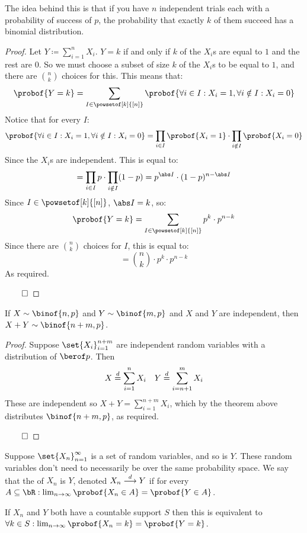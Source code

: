 The idea behind this is that if you have $n$ independent trials each with a probability of success of $p$, the probability that exactly
$k$ of them succeed has a binomial distribution.

\begin{proof}

	Let $Y\coloneqq\sum\limits_{i=1}^n X_i$.
	$Y=k$ if and only if $k$ of the $X_i$s are equal to $1$ and the rest are $0$.
	So we must choose a subset of size $k$ of the $X_i$s to be equal to $1$, and there are $\binom{n}{k}$ choices for this.
	This means that:
	\[ \probof{Y=k} = \sum_{I\in\powsetof[k]{[n]}}\probof{\forall i\in I: X_i=1, \forall i\notin I: X_i=0} \]
	Notice that for every $I$:
	\[ \probof{\forall i\in I: X_i=1, \forall i\notin I: X_i=0} = \prod_{i\in I}\probof{X_i=1} \cdot \prod_{i\notin I}\probof{X_i=0} \]
	Since the $X_i$s are independent.
	This is equal to:
	\[ = \prod_{i\in I}p \cdot \prod_{i\notin I}(1-p) = p^{\abs I}\cdot(1-p)^{n-\abs I} \]
	Since $I\in\powsetof[k]{[n]}$, $\abs I=k$, so:
	\[ \probof{Y=k} = \sum_{I\in\powsetof[k]{[n]}} p^k\cdot p^{n-k} \]
	Since there are $\binom nk$ choices for $I$, this is equal to:
	\[ = \binom nk\cdot p^k\cdot p^{n-k} \]
	As required.

	\hfill$\qed$

\end{proof}

\newpage
\begin{coro*}

	If $X\sim\binof{n,p}$ and $Y\sim\binof{m,p}$ and $X$ and $Y$ are independent, then $X+Y\sim\binof{n+m,p}$.

\end{coro*}

\begin{proof}

	Suppose $\set{X_i}_{i=1}^{n+m}$ are independent random variables with a distribution of $\berof p$.
	Then
	\[ X\mathrel{\overset d=}\sum_{i=1}^n X_i \quad Y\mathrel{\overset d=}\sum\limits_{i=n+1}^m X_i \]
	These are independent so $X+Y=\sum\limits_{i=1}^{n+m} X_i$, which by the theorem above distributes $\binof{n+m, p}$, as required.

	\hfill$\qed$

\end{proof}

\begin{defn*}

	Suppose $\set{X_n}_{n=1}^\infty$ is a set of random variables, and so is $Y$.
	These random variables don't need to necessarily be over the same probability space.
	We say that the  of $X_n$ is $Y$, denoted $X_n\mathrel{\overset d\longrightarrow} Y$ if for every
	$A\subseteq\bR: \lim_{n\to\infty}\probof{X_n\in A} = \probof{Y\in A}$.

	If $X_n$ and $Y$ both have a countable support $S$ then this is equivalent to
	$\forall k\in S: \lim_{n\to\infty}\probof{X_n=k} = \probof{Y=k}$.

\end{defn*}

